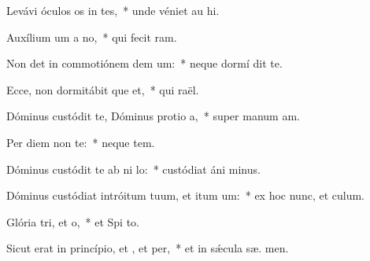 \item Levávi óculos os in tes,~* unde véniet au hi.
\item Auxílium um a no,~* qui fecit   ram.
\item Non det in commotiónem dem um:~* neque dormí  dit te.
\item Ecce, non dormitábit que et,~* qui  raël.
\item Dóminus custódit te, Dóminus protio a,~* super manum  am.
\item Per diem  non  te:~* neque   tem.
\item Dóminus custódit te ab ni lo:~* custódiat áni  minus.
\item Dóminus custódiat intróitum tuum, et itum um:~* ex hoc nunc, et   culum.
\item Glória tri, et o,~* et Spi to.
\item Sicut erat in princípio, et , et per,~* et in sǽcula sæ. men.
